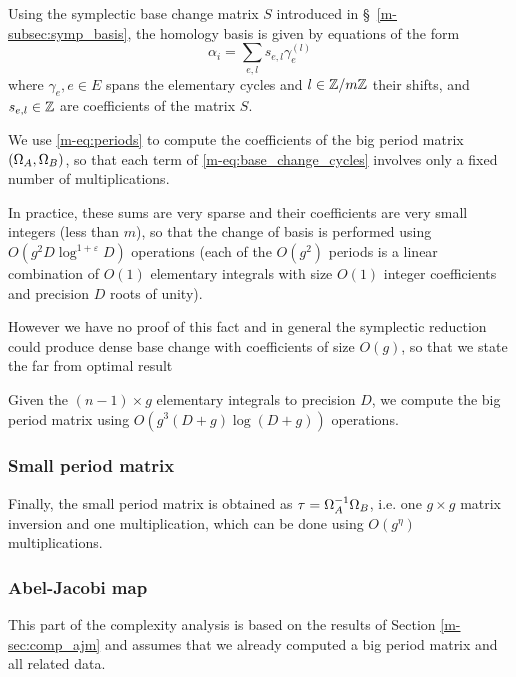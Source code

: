 \documentclass[main.tex]{subfiles}
\begin{document}
   Using the symplectic base change matrix $S$ introduced
   in \S~\ref{m-subsec:symp_basis}, the homology basis is given
   by equations of the form
   \begin{equation}
       \label{eq:base_change_cycles}
       \alpha_i = \sum_{e,l} s_{e,l}\gamma_e^{(l)}
   \end{equation}
   where $\gamma_e,e\in E$ spans the elementary cycles
   and $l\in\mathbb{Z}/m\mathbb{Z}$ their shifts,
   and $s_{e,l}\in\mathbb{Z}$ are coefficients of the matrix $S$. 

   We use \eqref{m-eq:periods} to compute the coefficients of the big period
   matrix $(\Omega_A,\Omega_B)$, so that each term of \eqref{m-eq:base_change_cycles}
   involves only a fixed number of multiplications.

   In practice, these sums are very sparse and their coefficients are very small integers
   (less than $m$), so that the change of basis is performed using
   $O(g^2D\log^{1+\varepsilon}D)$ operations
   (each of the $O(g^2)$ periods is a linear combination of $O(1)$ elementary integrals
   with size $O(1)$ integer coefficients and precision $D$ roots of unity).

   However we have no proof of this fact and in general the symplectic reduction
   could produce dense base change with coefficients of size $O(g)$,
   so that we state the far from optimal result
   \begin{thm}
       Given the $(n-1)\times g$ elementary integrals to precision $D$,
       we compute the big period matrix using $O(g^3(D+g)\log(D+g))$ operations.
   \end{thm}

   \subsubsection{Small period matrix}

   Finally, the small period matrix is obtained as $\tau=\Omega_A^{-1}\Omega_B$,
   i.e. one $g\times g$ matrix inversion and one multiplication, which
   can be done using $O(g^{\eta})$ multiplications.
   
   \subsubsection{Abel-Jacobi map}
   
  This part of the complexity analysis is based on the results of Section \ref{m-sec:comp_ajm} and assumes that we already computed a big period matrix and all related data.
   
\end{document}
